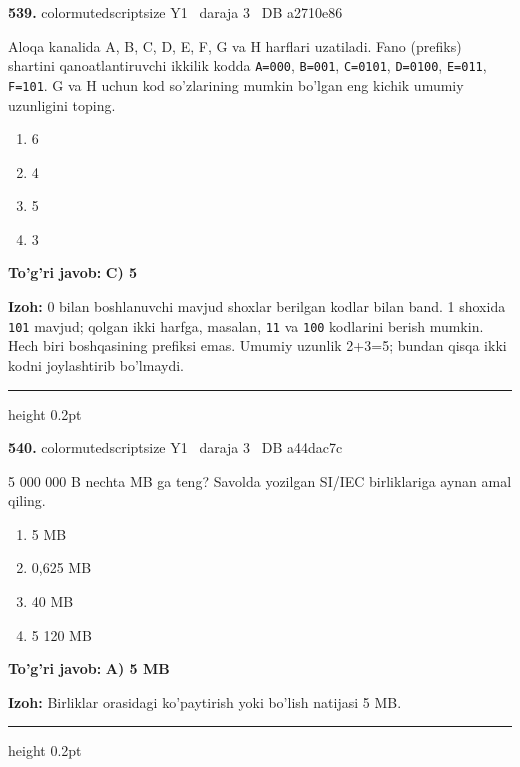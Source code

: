 \documentclass[10pt,a4paper,oneside]{article}
\begin{document}
\noindent\textbf{\color{ink}539.}  {color{muted}scriptsize Y1 \textbullet\ daraja 3 \textbullet\ DB a2710e86}
\par
Aloqa kanalida A, B, C, D, E, F, G va H harflari uzatiladi. Fano (prefiks) shartini qanoatlantiruvchi ikkilik kodda \texttt{A=000}, \texttt{B=001}, \texttt{C=0101}, \texttt{D=0100}, \texttt{E=011}, \texttt{F=101}. G va H uchun kod so'zlarining mumkin bo'lgan eng kichik umumiy uzunligini toping.
\begin{enumerate}[label=\Alph*),leftmargin=9mm]
\item 6
\item 4
\item 5
\item 3
\end{enumerate}
\begin{tcolorbox}[enhanced,breakable,colback=teal!4,colframe=teal!50!black,boxrule=0.5pt,arc=1.1mm,left=3mm,right=3mm,top=1.7mm,bottom=1.7mm,before skip=2mm,after skip=2mm]
\textbf{\color{teal}To'g'ri javob:} \textbf{C) 5}
\par\smallskip
\textbf{Izoh:} 0 bilan boshlanuvchi mavjud shoxlar berilgan kodlar bilan band. 1 shoxida \texttt{101} mavjud; qolgan ikki harfga, masalan, \texttt{11} va \texttt{100} kodlarini berish mumkin. Hech biri boshqasining prefiksi emas. Umumiy uzunlik 2+3=5; bundan qisqa ikki kodni joylashtirib bo'lmaydi.
\end{tcolorbox}
\vspace{2mm}\hrule height 0.2pt \vspace{3mm}

\noindent\textbf{\color{ink}540.}  {color{muted}scriptsize Y1 \textbullet\ daraja 3 \textbullet\ DB a44dac7c}
\par
5 000 000 B nechta MB ga teng? Savolda yozilgan SI/IEC birliklariga aynan amal qiling.
\begin{enumerate}[label=\Alph*),leftmargin=9mm]
\item 5 MB
\item 0,625 MB
\item 40 MB
\item 5 120 MB
\end{enumerate}
\begin{tcolorbox}[enhanced,breakable,colback=teal!4,colframe=teal!50!black,boxrule=0.5pt,arc=1.1mm,left=3mm,right=3mm,top=1.7mm,bottom=1.7mm,before skip=2mm,after skip=2mm]
\textbf{\color{teal}To'g'ri javob:} \textbf{A) 5 MB}
\par\smallskip
\textbf{Izoh:} Birliklar orasidagi ko'paytirish yoki bo'lish natijasi 5 MB.
\end{tcolorbox}
\vspace{2mm}\hrule height 0.2pt \vspace{3mm}
\end{document}

